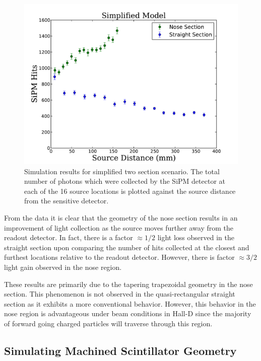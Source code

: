 	\begin{figure}[!htb]
	\centering
	\includegraphics[width=1.0\columnwidth]{simulation/figs/sim_results_v4}
	\caption{Simulation results for simplified two section scenario. The total number of photons which were collected by the SiPM detector at each of the 16 source locations is plotted against the source distance from the sensitive detector.}
	\label{fig:sim_results}
	\end{figure}

From the data it is clear that the geometry of the nose section results in an improvement of light collection as the source moves further away from the readout detector.  In fact, there is a factor $\approx 1/2$ light loss observed in the straight section upon comparing the number of hits collected at the closest and furthest locations relative to the readout detector.  However, there is factor $\approx 3/2$ light gain observed in the nose region.

These results are primarily due to the tapering trapezoidal geometry in the nose section.  This phenomenon is not observed in the quasi-rectangular straight section as it exhibits a more conventional behavior. However, this behavior in the nose region is advantageous under beam conditions in Hall-D since the majority of forward going charged particles will traverse through this region.

\subsection{Simulating Machined Scintillator Geometry} \label{sec:sim_mach}

